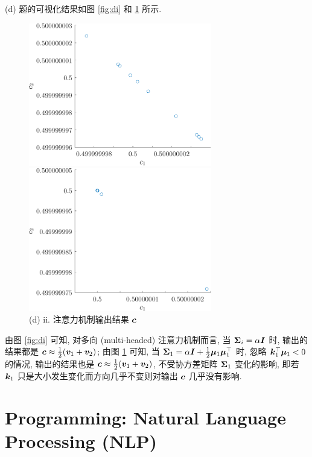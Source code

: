 \documentclass{article}
\begin{document}
(d) 题的可视化结果如图 \ref{fig:di} 和 \ref{fig:dii} 所示. 
\begin{figure}[htbp]
  \centering
  \begin{minipage}[t]{0.48\textwidth}
    \centering
    \includegraphics[width=8cm]{di.pdf}
    \caption{(d) i. 注意力机制输出结果 $\vc$}
    \label{fig:di}
  \end{minipage}
  \begin{minipage}[t]{0.48\textwidth}
    \centering
    \includegraphics[width=8cm]{dii.pdf}
    \caption{(d) ii. 注意力机制输出结果 $\vc$}
    \label{fig:dii}
  \end{minipage}
\end{figure}

由图 \ref{fig:di} 可知, 对多向 (multi-headed) 注意力机制而言, 当 $\bm{\Sigma}_{i}=\alpha \bm{I}$ 时, 输出的结果都是 $\bm{c}\approx\frac{1}{2}(\bm{v}_{1}+\bm{v}_{2})$; 由图 \ref{fig:dii} 可知, 当 $\bm{\Sigma}_{1}=\alpha \bm{I}+\frac{1}{2}\bm{\mu}_{1} \bm{\mu}_{1}^{\top}$ 时, 忽略 $\bm{k}_{1}^{\top}\bm{\mu}_1<0$ 的情况, 输出的结果也是 $\bm{c}\approx\frac{1}{2}(\bm{v}_{1}+\bm{v}_{2})$, 不受协方差矩阵 $\bm{\Sigma}_{1}$ 变化的影响, 即若 $\bm{k}_1$ 只是大小发生变化而方向几乎不变则对输出 $\vc$ 几乎没有影响.

\section*{Programming: Natural Language Processing (NLP)}
\end{document}
